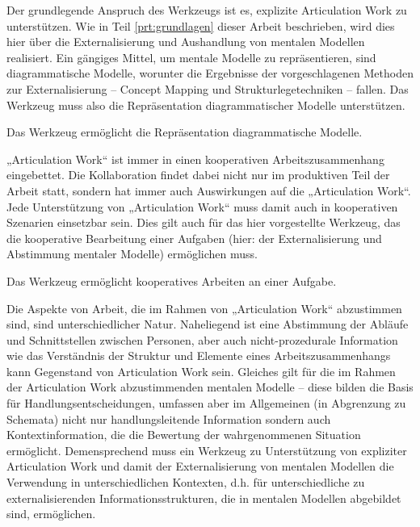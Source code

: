 Der grundlegende Anspruch des Werkzeugs ist es, explizite Articulation Work zu unterstützen. Wie in Teil \ref{prt:grundlagen} dieser Arbeit beschrieben, wird dies hier über die Externalisierung und Aushandlung von mentalen Modellen realisiert. Ein gängiges Mittel, um mentale Modelle zu repräsentieren, sind diagrammatische Modelle, worunter die Ergebnisse der vorgeschlagenen Methoden zur Externalisierung -- Concept Mapping und Strukturlegetechniken -- fallen. Das Werkzeug muss also die Repräsentation diagrammatischer Modelle unterstützen. 

\begin{hyp}
	\label{hyp:diagmodelle}
	Das Werkzeug ermöglicht die Repräsentation diagrammatische Modelle.
\end{hyp}

„Articulation Work“ ist immer in einen kooperativen Arbeitszusammenhang eingebettet. Die Kollaboration findet dabei nicht nur im produktiven Teil der Arbeit statt, sondern hat immer auch Auswirkungen auf die „Articulation Work“. Jede Unterstützung von „Articulation Work“ muss damit auch in kooperativen Szenarien einsetzbar sein. Dies gilt auch für das hier vorgestellte Werkzeug, das die kooperative Bearbeitung einer Aufgaben (hier: der Externalisierung und Abstimmung mentaler Modelle) ermöglichen muss. 

\begin{hyp}
	\label{hyp:kollaborativ}
	Das Werkzeug ermöglicht kooperatives Arbeiten an einer Aufgabe.
\end{hyp}

Die Aspekte von Arbeit, die im Rahmen von „Articulation Work“ abzustimmen sind, sind unterschiedlicher Natur. Naheliegend ist eine Abstimmung der Abläufe und Schnittstellen zwischen Personen, aber auch nicht-prozedurale Information wie das Verständnis der Struktur und Elemente eines Arbeitszusammenhangs kann Gegenstand von Articulation Work sein. Gleiches gilt für die im Rahmen der Articulation Work abzustimmenden mentalen Modelle -- diese bilden die Basis für Handlungsentscheidungen, umfassen aber im Allgemeinen (in Abgrenzung zu Schemata) nicht nur handlungsleitende Information sondern auch Kontextinformation, die die Bewertung der wahrgenommenen Situation ermöglicht. Demensprechend muss ein Werkzeug zu Unterstützung von expliziter Articulation Work und damit der Externalisierung von mentalen Modellen die Verwendung in unterschiedlichen Kontexten, d.h. für unterschiedliche zu externalisierenden Informationsstrukturen, die in mentalen Modellen abgebildet sind, ermöglichen.

